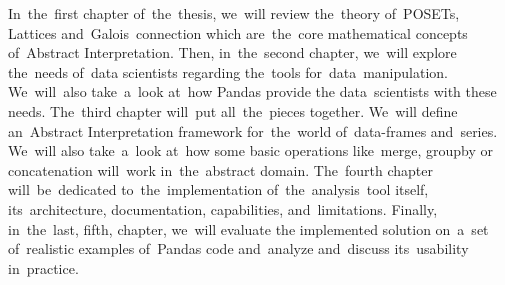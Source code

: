 In~the~first chapter of~the~thesis, we~will review the~theory of~POSETs, Lattices and~Galois~connection which
are~the~core mathematical concepts of~Abstract Interpretation.
Then, in~the~second chapter, we~will explore the~needs of~data scientists regarding the~tools for~data~manipulation.
We~will~also take~a~look at~how Pandas provide the data~scientists with these needs.
The~third chapter will~put all~the~pieces together.
We~will define an~Abstract Interpretation framework for~the~world of~data-frames and~series.
We~will also take~a~look at~how some basic operations like~merge, groupby or concatenation will~work in~the~abstract domain.
The~fourth chapter will~be~dedicated to~the~implementation of~the~analysis~tool itself, its~architecture, documentation,
capabilities, and~limitations.
Finally, in~the~last, fifth, chapter, we~will evaluate the implemented solution on~a~set of~realistic examples of~Pandas
code and~analyze and~discuss its~usability in~practice.